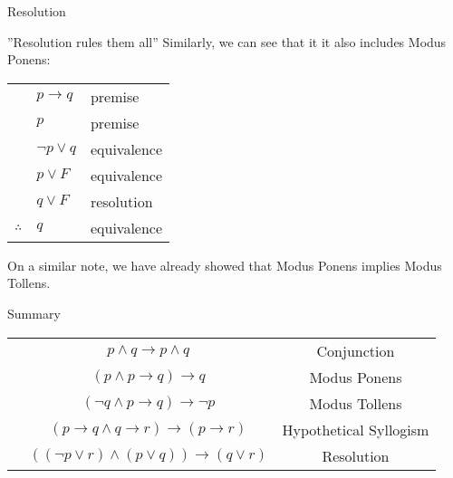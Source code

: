 \documentclass{article}
\begin{document}
\begin{parag}{Resolution}
\begin{subparag}{''Resolution rules them all''}
        Similarly, we can see that it it also includes Modus Ponens:
        \begin{center}
        \begin{tabular}{rll}
            & $p \to q$ & premise  \\
            & $p$ & premise \\
            & $\lnot p \lor q$ & equivalence \\
            & $p \lor F$ & equivalence \\
            & $q \lor F$ & resolution \\
            \hline
            $\therefore$ & $q$ & equivalence
        \end{tabular}
        \end{center}

        On a similar note, we have already showed that Modus Ponens implies Modus Tollens.
    \end{subparag}
\end{parag}

\begin{parag}{Summary}
    \begin{center}
        \begin{tabularx}{\linewidth}{|>{\hsize}C|>{\hsize}C|>{\hsize}C|}
        \hline
         &  &   \\
        \hline
         & $p \land q \to p \land q$ & Conjunction \\
        \hline
         & $\left(p \land p \to q\right) \to q$ & Modus Ponens \\
        \hline
         & $\left(\lnot q \land p \to q\right) \to \lnot p$ & Modus Tollens \\
        \hline
         & $\left(p\to q \land q\to r\right) \to \left(p \to r\right)$ & Hypothetical Syllogism \\
        \hline
         & $\left(\left(\lnot p \lor r\right) \land \left(p \lor q\right)\right) \to \left(q \lor r\right)$ & Resolution  \\
        \hline
    \end{tabularx}
    \end{center}
\end{parag}
\end{document}
